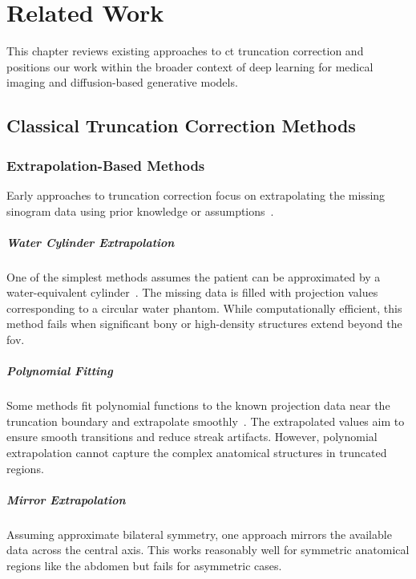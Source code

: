 \chapter{Related Work}
\label{ch:related_work}

This chapter reviews existing approaches to \gls{ct} truncation correction and positions our work within the broader context of deep learning for medical imaging and diffusion-based generative models.

\section{Classical Truncation Correction Methods}

\subsection{Extrapolation-Based Methods}

Early approaches to truncation correction focus on extrapolating the missing sinogram data using prior knowledge or assumptions~\cite{ohnesorge2000efficient}.

\paragraph{Water Cylinder Extrapolation} One of the simplest methods assumes the patient can be approximated by a water-equivalent cylinder~\cite{ohnesorge2000efficient}. The missing data is filled with projection values corresponding to a circular water phantom. While computationally efficient, this method fails when significant bony or high-density structures extend beyond the \gls{fov}.

\paragraph{Polynomial Fitting} Some methods fit polynomial functions to the known projection data near the truncation boundary and extrapolate smoothly~\cite{sourbelle2005reconstruction}. The extrapolated values aim to ensure smooth transitions and reduce streak artifacts. However, polynomial extrapolation cannot capture the complex anatomical structures in truncated regions.

\paragraph{Mirror Extrapolation} Assuming approximate bilateral symmetry, one approach mirrors the available data across the central axis. This works reasonably well for symmetric anatomical regions like the abdomen but fails for asymmetric cases.

